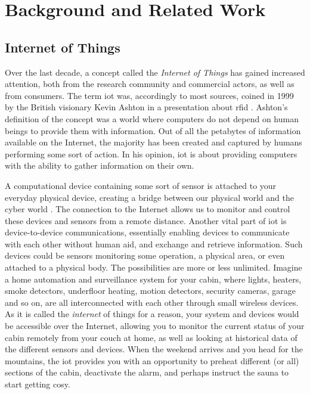 \chapter{Background and Related Work}
\label{chp:background}

\section{Internet of Things}
\label{sec:iot}

Over the last decade, a concept called the \emph{Internet of Things} has gained increased attention, both from the research community and commercial actors, as well as from consumers. The term \gls{iot} was, accordingly to most sources, coined in 1999 by the British visionary Kevin Ashton in a presentation about \gls{rfid} \cite{iot-phrase-2} \cite{iot-phrase-1}. Ashton's definition of the concept was a world where computers do not depend on human beings to provide them with information. Out of all the petabytes of information available on the Internet, the majority has been created and captured by humans performing some sort of action. In his opinion, \gls{iot} is about providing computers with the ability to gather information on their own.



A computational device containing some sort of sensor is attached to your everyday physical device, creating a bridge between our physical world and the cyber world \cite{Kopetz2011}. The connection to the Internet allows us to monitor and control these devices and sensors from a remote distance. Another vital part of \gls{iot} is device-to-device communications, essentially enabling devices to communicate with each other without human aid, and exchange and retrieve information. Such devices could be sensors monitoring some operation, a physical area, or even attached to a physical body. The possibilities are more or less unlimited. Imagine a home automation and surveillance system for your cabin, where lights, heaters, smoke detectors, underfloor heating, motion detectors, security cameras, garage and so on, are all interconnected with each other through small wireless devices. As it is called the \emph{internet} of things for a reason, your system and devices would be accessible over the Internet, allowing you to monitor the current status of your cabin remotely from your couch at home, as well as looking at historical data of the different sensors and devices. When the weekend arrives and you head for the mountains, the \gls{iot} provides you with an opportunity to preheat different (or all) sections of the cabin, deactivate the alarm, and perhaps instruct the sauna to start getting cosy. 

